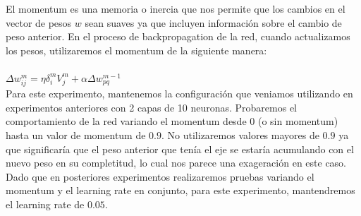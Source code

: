 El momentum es una memoria o inercia que nos permite que los cambios en el vector de pesos $w$ sean suaves ya que incluyen información sobre el cambio de peso anterior. 
En el proceso de backpropagation de la red, cuando actualizamos los pesos, utilizaremos el momentum de la siguiente manera:
\\
\\
$\Delta w_{ij}^{m} = \eta \delta_{i}^{m}V_{j}^{m} + \alpha \Delta w_{pq}^{m-1}$
\\

Para este experimento, mantenemos la configuración que veniamos utilizando en experimentos anteriores con 2 capas de 10 neuronas. Probaremos el comportamiento de la red 
variando el momentum desde $0$ (o sin momentum) hasta un valor de momentum de $0.9$. No utilizaremos valores mayores de $0.9$ ya que significaría que el peso anterior que 
tenía el eje se estaría acumulando con el nuevo peso en su completitud, lo cual nos parece una exageración en este caso. Dado que en posteriores experimentos realizaremos
pruebas variando el momentum y el learning rate en conjunto, para este experimento, mantendremos el learning rate de $0.05$.

